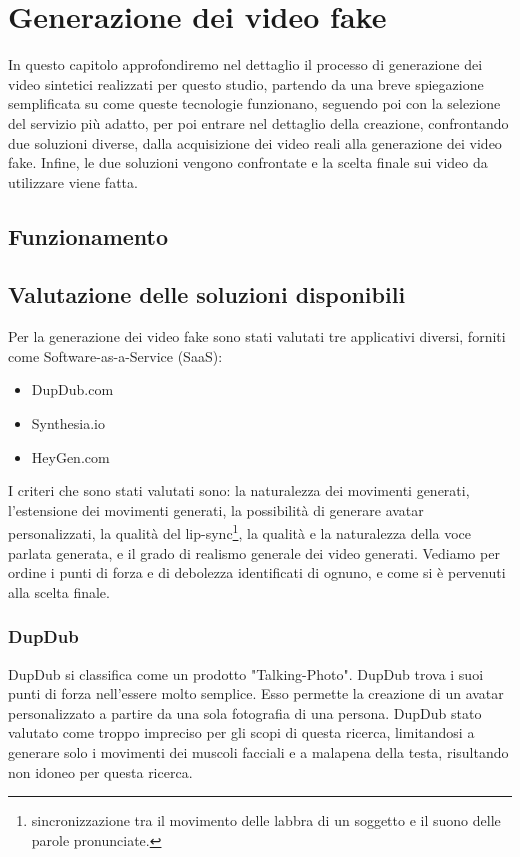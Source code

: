 \chapter{Generazione dei video fake}

In questo capitolo approfondiremo nel dettaglio il processo di generazione dei video sintetici realizzati per questo studio, partendo da una breve spiegazione semplificata su come queste tecnologie funzionano, seguendo poi con la selezione del servizio più adatto, per poi entrare nel dettaglio della creazione, confrontando due soluzioni diverse, dalla acquisizione dei video reali alla generazione dei video fake. Infine, le due soluzioni vengono confrontate e la scelta finale sui video da utilizzare viene fatta.

\section{Funzionamento}
\label{sec:funzionamento}

\section{Valutazione delle soluzioni disponibili}

Per la generazione dei video fake sono stati valutati tre applicativi diversi, forniti come Software-as-a-Service (SaaS):
\begin{itemize}
    \item DupDub.com
    \item Synthesia.io
    \item HeyGen.com
\end{itemize}

I criteri che sono stati valutati sono: la naturalezza dei movimenti generati, l'estensione dei movimenti generati, la possibilità di generare avatar personalizzati, la qualità del lip-sync\footnote{sincronizzazione tra il movimento delle labbra di un soggetto e il suono delle parole pronunciate.}, la qualità e la naturalezza della voce parlata generata, e il grado di realismo generale dei video generati. Vediamo per ordine i punti di forza e di debolezza identificati di ognuno, e come si è pervenuti alla scelta finale. 

\subsection{DupDub}

DupDub si classifica come un prodotto "Talking-Photo". DupDub trova i suoi punti di forza nell'essere molto semplice. Esso permette la creazione di un avatar personalizzato a partire da una sola fotografia di una persona. DupDub stato valutato come troppo impreciso per gli scopi di questa ricerca, limitandosi a generare solo i movimenti dei muscoli facciali e a malapena della testa, risultando non idoneo per questa ricerca.

